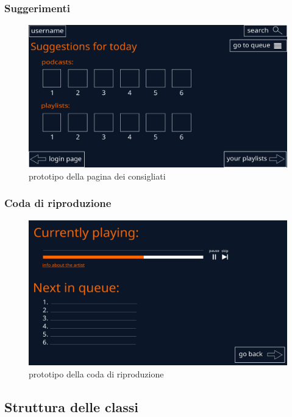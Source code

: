 \documentclass{article}
\begin{document}
  \subsubsection{Suggerimenti}
  \begin{figure}[H]
    \centering
    \includegraphics[scale=0.25]{suggestions}
    \caption{prototipo della pagina dei consigliati}
    \label{fig:suggestionsPage}
  \end{figure}

  \subsubsection{Coda di riproduzione}
  \begin{figure}[H]
    \centering
    \includegraphics[scale=0.25]{playback}
    \caption{prototipo della coda di riproduzione}
    \label{fig:playbackQueue}
  \end{figure}

  \subsection{Struttura delle classi}
\end{document}
